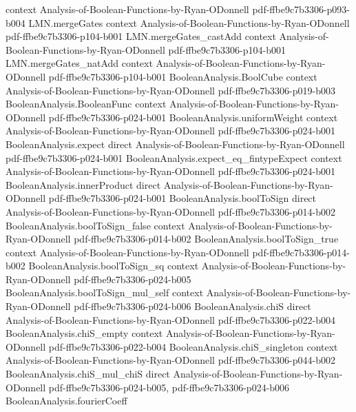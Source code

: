 \begin{lemma}
  {context}
  {Analysis-of-Boolean-Functions-by-Ryan-ODonnell}
  {pdf-ffbe9c7b3306-p093-b004}
\proofstep
  {LMN.mergeGates}
  {context}
  {Analysis-of-Boolean-Functions-by-Ryan-ODonnell}
  {pdf-ffbe9c7b3306-p104-b001}
\proofstep
  {LMN.mergeGates_castAdd}
  {context}
  {Analysis-of-Boolean-Functions-by-Ryan-ODonnell}
  {pdf-ffbe9c7b3306-p104-b001}
\proofstep
  {LMN.mergeGates_natAdd}
  {context}
  {Analysis-of-Boolean-Functions-by-Ryan-ODonnell}
  {pdf-ffbe9c7b3306-p104-b001}
\proofstep
  {BooleanAnalysis.BoolCube}
  {context}
  {Analysis-of-Boolean-Functions-by-Ryan-ODonnell}
  {pdf-ffbe9c7b3306-p019-b003}
\proofstep
  {BooleanAnalysis.BooleanFunc}
  {context}
  {Analysis-of-Boolean-Functions-by-Ryan-ODonnell}
  {pdf-ffbe9c7b3306-p024-b001}
\proofstep
  {BooleanAnalysis.uniformWeight}
  {context}
  {Analysis-of-Boolean-Functions-by-Ryan-ODonnell}
  {pdf-ffbe9c7b3306-p024-b001}
\proofstep
  {BooleanAnalysis.expect}
  {direct}
  {Analysis-of-Boolean-Functions-by-Ryan-ODonnell}
  {pdf-ffbe9c7b3306-p024-b001}
\proofstep
  {BooleanAnalysis.expect_eq_fintypeExpect}
  {context}
  {Analysis-of-Boolean-Functions-by-Ryan-ODonnell}
  {pdf-ffbe9c7b3306-p024-b001}
\proofstep
  {BooleanAnalysis.innerProduct}
  {direct}
  {Analysis-of-Boolean-Functions-by-Ryan-ODonnell}
  {pdf-ffbe9c7b3306-p024-b001}
\proofstep
  {BooleanAnalysis.boolToSign}
  {direct}
  {Analysis-of-Boolean-Functions-by-Ryan-ODonnell}
  {pdf-ffbe9c7b3306-p014-b002}
\proofstep
  {BooleanAnalysis.boolToSign_false}
  {context}
  {Analysis-of-Boolean-Functions-by-Ryan-ODonnell}
  {pdf-ffbe9c7b3306-p014-b002}
\proofstep
  {BooleanAnalysis.boolToSign_true}
  {context}
  {Analysis-of-Boolean-Functions-by-Ryan-ODonnell}
  {pdf-ffbe9c7b3306-p014-b002}
\proofstep
  {BooleanAnalysis.boolToSign_sq}
  {context}
  {Analysis-of-Boolean-Functions-by-Ryan-ODonnell}
  {pdf-ffbe9c7b3306-p024-b005}
\proofstep
  {BooleanAnalysis.boolToSign_mul_self}
  {context}
  {Analysis-of-Boolean-Functions-by-Ryan-ODonnell}
  {pdf-ffbe9c7b3306-p024-b006}
\proofstep
  {BooleanAnalysis.chiS}
  {direct}
  {Analysis-of-Boolean-Functions-by-Ryan-ODonnell}
  {pdf-ffbe9c7b3306-p022-b004}
\proofstep
  {BooleanAnalysis.chiS_empty}
  {context}
  {Analysis-of-Boolean-Functions-by-Ryan-ODonnell}
  {pdf-ffbe9c7b3306-p022-b004}
\proofstep
  {BooleanAnalysis.chiS_singleton}
  {context}
  {Analysis-of-Boolean-Functions-by-Ryan-ODonnell}
  {pdf-ffbe9c7b3306-p044-b002}
\proofstep
  {BooleanAnalysis.chiS_mul_chiS}
  {direct}
  {Analysis-of-Boolean-Functions-by-Ryan-ODonnell}
  {pdf-ffbe9c7b3306-p024-b005,
    pdf-ffbe9c7b3306-p024-b006}
\proofstep
  {BooleanAnalysis.fourierCoeff}

\end{lemma}
